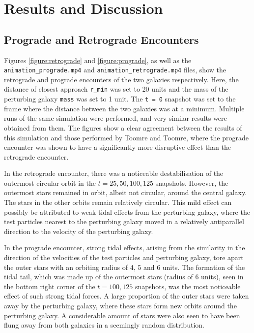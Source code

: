 \documentclass[twoside,twocolumn]{article}
\begin{document}
        
\section{Results and Discussion}   

    \subsection{Prograde and Retrograde Encounters}

        Figures \ref{figure:retrograde} and \ref{figure:prograde}, as well as the \texttt{animation\_prograde.mp4} and \texttt{animation\_retrograde.mp4} files, show the retrograde and prograde encounters of the two galaxies respectively. Here, the distance of closest approach \texttt{r\_min} was set to 20 units and the mass of the perturbing galaxy \texttt{mass} was set to 1 unit. The \texttt{t = 0} snapshot was set to the frame where the distance between the two galaxies was at a minimum. Multiple runs of the same simulation were performed, and very similar results were obtained from them. The figures show a clear agreement between the results of this simulation and those performed by Toomre and Toomre, where the prograde encounter was shown to have a significantly more disruptive effect than the retrograde encounter. 
        
        In the retrograde encounter, there was a noticeable destabilisation of the outermost circular orbit in the $t = 25, 50, 100, 125$ snapshots. However, the outermost stars remained in orbit, albeit not circular, around the central galaxy. The stars in the other orbits remain relatively circular. This mild effect can possibly be attributed to weak tidal effects from the perturbing galaxy, where the test particles nearest to the perturbing galaxy moved in a relatively antiparallel direction to the velocity of the perturbing galaxy.
        
        In the prograde encounter, strong tidal effects, arising from the similarity in the direction of the velocities of the test particles and perturbing galaxy, tore apart the outer stars with an orbiting radius of 4, 5 and 6 units. The formation of the tidal tail, which was made up of the outermost stars (radius of 6 units), seen in the bottom right corner of the $t = 100, 125$ snapshots, was the most noticeable effect of such strong tidal forces. A large proportion of the outer stars were taken away by the perturbing galaxy, where these stars form new orbits around the perturbing galaxy. A considerable amount of stars were also seen to have been flung away from both galaxies in a seemingly random distribution.
\end{document}
